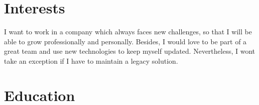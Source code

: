 \documentclass[letterpaper]{twentysecondcv} %
\begin{document}

\section{Interests}

I want to work in a company which always faces new challenges, so that I will be able to grow professionally and personally. Besides, I would love to be part of a great team and use new technologies to keep myself updated. Nevertheless, I wont take an exception if I have to maintain a legacy solution. 

\section{Education}

\begin{twenty} %
\end{twenty}



\end{document}
